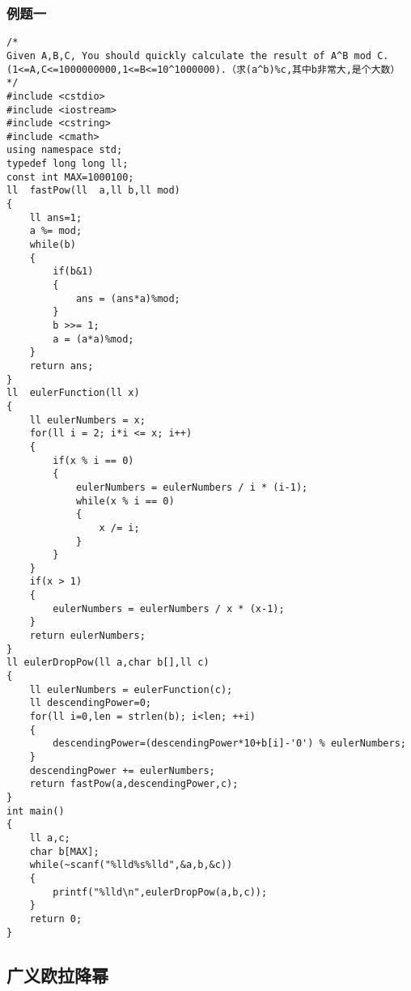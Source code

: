 \subsubsection{例题一}
\begin{lstlisting}
/*
Given A,B,C, You should quickly calculate the result of A^B mod C. (1<=A,C<=1000000000,1<=B<=10^1000000).（求(a^b)%c,其中b非常大,是个大数）
*/
#include <cstdio>
#include <iostream>
#include <cstring>
#include <cmath>
using namespace std;
typedef long long ll;
const int MAX=1000100;
ll  fastPow(ll  a,ll b,ll mod)
{
	ll ans=1;
	a %= mod;
	while(b)
	{
		if(b&1)
		{
			ans = (ans*a)%mod;
		}
		b >>= 1;
		a = (a*a)%mod;
	}
	return ans;
}
ll  eulerFunction(ll x)
{
	ll eulerNumbers = x;
	for(ll i = 2; i*i <= x; i++)
	{
		if(x % i == 0)
		{
			eulerNumbers = eulerNumbers / i * (i-1);
			while(x % i == 0)
			{
				x /= i;
			}
		}
	}
	if(x > 1)
	{
		eulerNumbers = eulerNumbers / x * (x-1);
	}
	return eulerNumbers;
}
ll eulerDropPow(ll a,char b[],ll c)
{
	ll eulerNumbers = eulerFunction(c);
	ll descendingPower=0;
	for(ll i=0,len = strlen(b); i<len; ++i)
	{
		descendingPower=(descendingPower*10+b[i]-'0') % eulerNumbers;
	}
	descendingPower += eulerNumbers;
	return fastPow(a,descendingPower,c);
}
int main()
{
	ll a,c;
	char b[MAX];
	while(~scanf("%lld%s%lld",&a,b,&c))
	{
		printf("%lld\n",eulerDropPow(a,b,c));
	}
	return 0;
}
\end{lstlisting}


\subsection{广义欧拉降幂}
